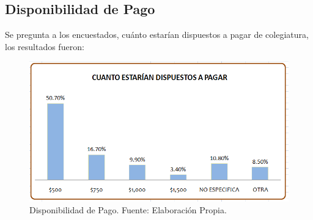 

\clearpage
\subsection{Disponibilidad de Pago}

Se pregunta a los encuestados, cuánto estarían dispuestos a pagar de colegiatura, los resultados fueron:

\begin{figure}[h!]
	\centering
	\includegraphics[scale=0.5]{images/encuesta_pago}
	\caption{Disponibilidad de Pago. Fuente: Elaboración Propia.}
	\label{fig:Encuesta:Pago}
\end{figure}




\newpage
